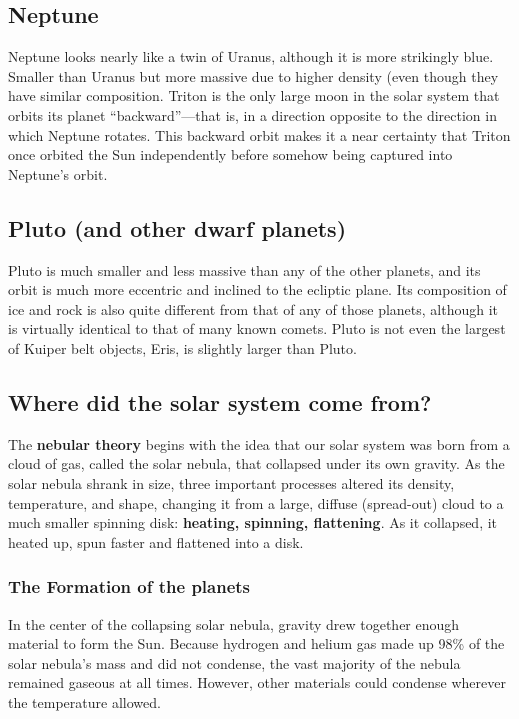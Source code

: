 \subsection {Neptune}
Neptune looks nearly like a twin of Uranus, although it is more strikingly blue. Smaller than Uranus but more massive due to higher density (even though they have similar composition. Triton is the only large moon in the solar system that orbits its planet “backward”—that is, in a direction opposite to the direction in which Neptune rotates. This backward orbit makes it a near certainty that Triton once orbited the Sun independently before somehow being captured into Neptune’s orbit.

\subsection {Pluto (and other dwarf planets)}
Pluto is much smaller and less massive than any of the other planets, and its orbit is much more eccentric and inclined to the ecliptic plane. Its composition of ice and rock is also quite different from that of any of those planets, although it is virtually identical to that of many known comets. Pluto is not even the largest of Kuiper belt objects, Eris, is slightly larger than Pluto.

\subsection{Where did the solar system come from?}
The {\bf nebular theory} begins with the idea that our solar system was born from a cloud of gas, called the solar nebula, that collapsed under its own gravity. As the solar nebula shrank in size, three important processes altered its density, temperature, and shape, changing it from a large, diffuse (spread-out) cloud to a much smaller spinning disk: {\bf heating, spinning, flattening}. As it collapsed, it heated up, spun faster and flattened into a disk.

\subsubsection{The Formation of the planets}
In the center of the collapsing solar nebula, gravity drew together enough material to form the Sun. Because hydrogen and helium gas made up 98\% of the solar nebula’s mass and did not condense, the vast majority of the nebula remained gaseous at all times. However, other materials could condense wherever the temperature allowed.

